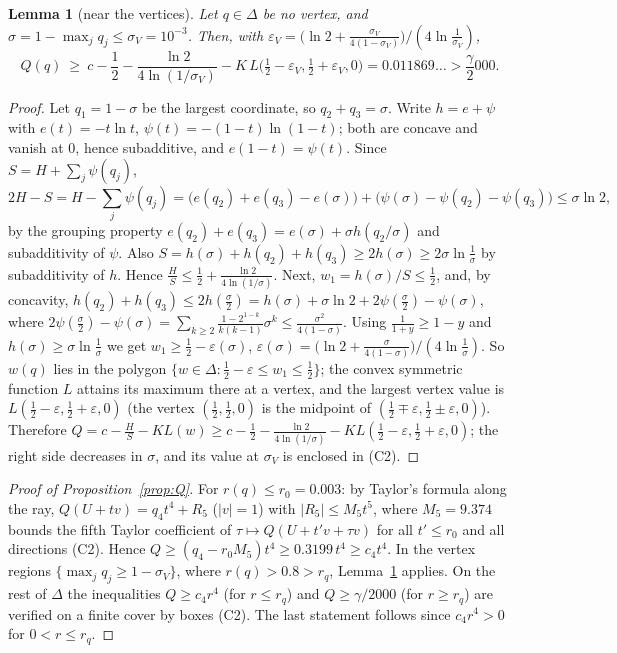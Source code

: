 \documentclass[11pt]{article}
\newtheorem{lemma}{Lemma}[section]
\theoremstyle{definition}
\numberwithin{equation}{section}
\newcommand{\Azero}{2000}
\begin{document}
\begin{lemma}[near the vertices]\label{lem:vertex}
Let $q\in\Delta$ be no vertex, and $\sigma=1-\max_jq_j\le\sigma_V=10^{-3}$. Then, with
$\varepsilon_V=\bigl(\ln2+\frac{\sigma_V}{4(1-\sigma_V)}\bigr)/(4\ln\frac1{\sigma_V})$,
\[
Q(q)\ \ge\ c-\frac12-\frac{\ln2}{4\ln(1/\sigma_V)}-K\,L\bigl(\tfrac12-\varepsilon_V,\tfrac12+\varepsilon_V,0\bigr)=0.011869\ldots>\frac\gamma\Azero .
\]
\end{lemma}
\begin{proof}
Let $q_1=1-\sigma$ be the largest coordinate, so $q_2+q_3=\sigma$. Write $h=e+\psi$ with $e(t)=-t\ln t$, $\psi(t)=-(1-t)\ln(1-t)$;
both are concave and vanish at $0$, hence subadditive, and $e(1-t)=\psi(t)$. Since $S=H+\sum_j\psi(q_j)$,
\[
2H-S=H-\sum_j\psi(q_j)=\bigl(e(q_2)+e(q_3)-e(\sigma)\bigr)+\bigl(\psi(\sigma)-\psi(q_2)-\psi(q_3)\bigr)\le\sigma\ln2,
\]
by the grouping property $e(q_2)+e(q_3)=e(\sigma)+\sigma h(q_2/\sigma)$ and subadditivity of $\psi$. Also $S=h(\sigma)+h(q_2)+h(q_3)\ge2h(\sigma)\ge
2\sigma\ln\frac1\sigma$ by subadditivity of $h$. Hence $\frac HS\le\frac12+\frac{\ln2}{4\ln(1/\sigma)}$. Next, $w_1=h(\sigma)/S\le\frac12$, and,
by concavity, $h(q_2)+h(q_3)\le2h(\frac\sigma2)=h(\sigma)+\sigma\ln2+2\psi(\frac\sigma2)-\psi(\sigma)$, where
$2\psi(\frac\sigma2)-\psi(\sigma)=\sum_{k\ge2}\frac{1-2^{1-k}}{k(k-1)}\sigma^k\le\frac{\sigma^2}{4(1-\sigma)}$. Using $\frac1{1+y}\ge1-y$ and
$h(\sigma)\ge\sigma\ln\frac1\sigma$ we get $w_1\ge\frac12-\varepsilon(\sigma)$, $\varepsilon(\sigma)=\bigl(\ln2+\frac\sigma{4(1-\sigma)}\bigr)/(4\ln\frac1\sigma)$.
So $w(q)$ lies in the polygon $\{w\in\Delta:\frac12-\varepsilon\le w_1\le\frac12\}$; the convex symmetric function $L$ attains its maximum
there at a vertex, and the largest vertex value is $L(\frac12-\varepsilon,\frac12+\varepsilon,0)$ (the vertex $(\frac12,\frac12,0)$ is the
midpoint of $(\frac12\mp\varepsilon,\frac12\pm\varepsilon,0)$). Therefore $Q=c-\frac HS-KL(w)\ge c-\frac12-\frac{\ln2}{4\ln(1/\sigma)}
-KL(\frac12-\varepsilon,\frac12+\varepsilon,0)$; the right side decreases in $\sigma$, and its value at $\sigma_V$ is enclosed in (C2).
\end{proof}

\begin{proof}[Proof of Proposition~\ref{prop:Q}]
For $r(q)\le r_0=0.003$: by Taylor's formula along the ray, $Q(U+tv)=q_4t^4+R_5$ ($|v|=1$) with $|R_5|\le M_5t^5$, where $M_5=9.374$
bounds the fifth Taylor coefficient of $\tau\mapsto Q(U+t'v+\tau v)$ for all $t'\le r_0$ and all directions (C2). Hence
$Q\ge(q_4-r_0M_5)t^4\ge0.3199\,t^4\ge c_4t^4$. In the vertex regions $\{\max_jq_j\ge1-\sigma_V\}$, where $r(q)>0.8>r_q$, Lemma~\ref{lem:vertex}
applies. On the rest of $\Delta$ the inequalities $Q\ge c_4r^4$ (for $r\le r_q$) and $Q\ge\gamma/\Azero$ (for $r\ge r_q$) are verified on a
finite cover by boxes (C2). The last statement follows since $c_4r^4>0$ for $0<r\le r_q$.
\end{proof}
\end{document}
